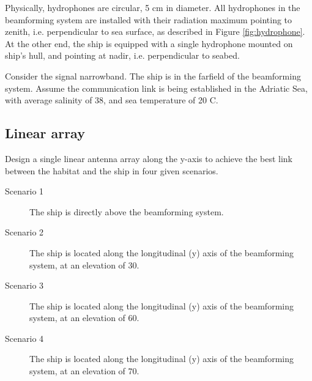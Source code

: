 \documentclass{article}
\begin{document}
Physically, hydrophones are circular, 5 cm in diameter. All hydrophones in the 
beamforming system are installed with their radiation maximum pointing to 
zenith, i.e. perpendicular to sea surface, as described in Figure 
\ref{fig:hydrophone}. At the other end, the ship is equipped with a single 
hydrophone mounted on ship's hull, and pointing at nadir, i.e. perpendicular to 
seabed.

Consider the signal narrowband. The ship is in the farfield of the beamforming 
system. Assume the communication link is being established in the Adriatic Sea, 
with average salinity of 38\textperthousand, and sea temperature of 20 
\textdegree C.

\subsection{Linear array}

Design a single linear antenna array along the y-axis to achieve the best link 
between the habitat and the ship in four given scenarios.
\begin{description}
	\item[Scenario 1] The ship is directly above the beamforming system.
	\item[Scenario 2] The ship is located along the longitudinal (y) axis of 
	the beamforming system, at an elevation of 30\textdegree.
	\item[Scenario 3] The ship is located along the longitudinal (y) axis of 
	the beamforming system, at an elevation of 60\textdegree.
	\item[Scenario 4] The ship is located along the longitudinal (y) axis of 
	the beamforming system, at an elevation of 70\textdegree.
\end{description}
\end{document}
